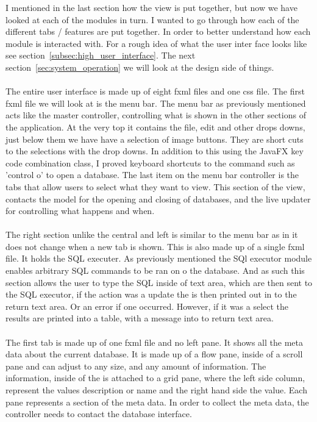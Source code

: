 I mentioned in the last section how the view is put together, but now we have looked at each of the modules in turn. I wanted to go through how each of the different tabs / features are put together. In order to better understand how each module is interacted with. For a rough idea of what the user inter face looks like see section~\ref{subsec:high_user_interface}. The next section~\ref{sec:system_operation} we will look at the design side of things. 
\\\\
The entire user interface is made up of eight fxml files and one css file.  The first fxml file we will look at is the menu bar. The menu bar as previously mentioned acts like the master controller, controlling what is shown in the other sections of the application. At the very top it contains the file, edit and other drops downs, just below them we have have a selection of image buttons. They are short cuts to the selections with the drop downs. In addition to this using the JavaFX key code combination class, I proved keyboard shortcuts to the command such as 'control o' to open a database. The last item on the menu bar controller is the tabs that allow users to select what they want to view. This section of the view, contacts the model for the opening and closing of databases, and the live updater for controlling what happens and when.  
\\\\
The right section unlike the central and left is similar to the menu bar as in it does not change when a new tab is shown. This is also made up of a single fxml file. It holds the SQL executer. As previously mentioned the SQl executor module enables arbitrary SQL commands to be ran on o the database. And as such this section allows the user to type the SQL inside of text area, which are then sent to the SQL executor, if the action was a update the is then printed out in to the return text area. Or an error if one occurred. However, if it was a select the results are printed into a table, with a message into to return text area.
\\\\
The first tab is made up of one fxml file and no left pane. It shows all the meta data about the current database. It is made up of a flow pane, inside of a scroll pane and can adjust to any size, and any amount of information. The information, inside of the is attached to a grid pane, where the left side column, represent the values description or name and the right hand side the value. Each pane represents a section of the meta data. In order to collect the meta data, the controller needs to contact the database interface.
